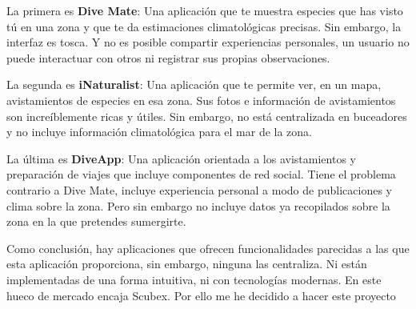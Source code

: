 La primera es \textbf{Dive Mate}: Una aplicación que te muestra especies que has visto tú en una zona y que te da estimaciones climatológicas precisas. Sin embargo, la interfaz es tosca. Y no es posible compartir experiencias personales, un usuario no puede interactuar con otros ni registrar sus propias observaciones.

La segunda es \textbf{iNaturalist}: Una aplicación que te permite ver, en un mapa, avistamientos de especies en esa zona. Sus fotos e información de avistamientos son increíblemente ricas y útiles. Sin embargo, no está centralizada en buceadores y no incluye información climatológica para el mar de la zona.

La última es \textbf{DiveApp}: Una aplicación orientada a los avistamientos y preparación de viajes que incluye componentes de red social. Tiene el problema contrario a Dive Mate, incluye experiencia personal a modo de publicaciones y clima sobre la zona. Pero sin embargo no incluye datos ya recopilados sobre la zona en la que pretendes sumergirte.

Como conclusión, hay aplicaciones que ofrecen funcionalidades parecidas a las que esta aplicación proporciona, sin embargo, ninguna las centraliza. Ni están implementadas de una forma intuitiva, ni con tecnologías modernas. En este hueco de mercado encaja Scubex. Por ello me he decidido a hacer este proyecto  